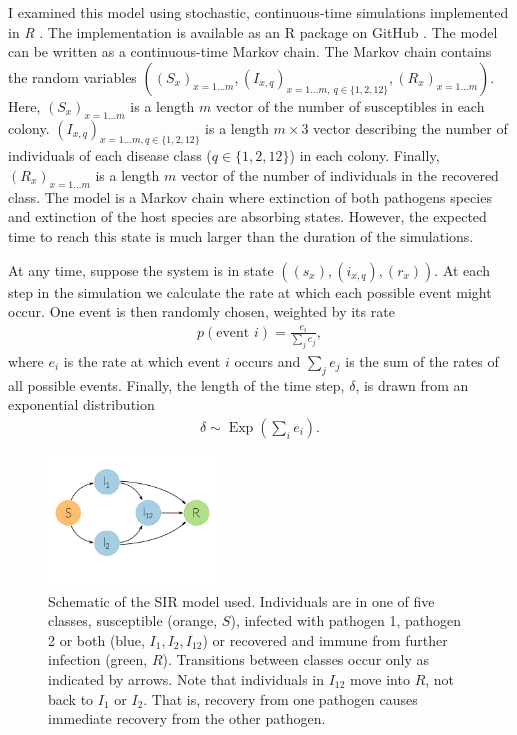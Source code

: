 I examined this model using stochastic, continuous-time simulations implemented in \emph{R} \cite{R}.
The implementation is available as an R package on GitHub \cite{metapopepi}.
The model can be written as a continuous-time Markov chain.
The Markov chain contains the random variables $((S_x)_{x = 1\ldots m}, (I_{x, q})_{x =1\ldots m,\:q \in \{1, 2, 12\}}, (R_x)_{x = 1\ldots m})$.
Here, $(S_x)_{x = 1\ldots m}$ is a length $m$ vector of the number of susceptibles in each colony.
$(I_{x, q})_{x =1\ldots m, q \in \{1, 2, 12\}}$ is a length $m \times 3$ vector describing the number of individuals of each disease class ($q \in \{1, 2, 12\}$) in each colony.
Finally, $(R_x)_{x = 1\ldots m}$ is a length $m$ vector of the number of individuals in the recovered class.
The model is a Markov chain where extinction of both pathogens species and extinction of the host species are absorbing states.
However, the expected time to reach this state is much larger than the duration of the simulations.

At any time, suppose the system is in state $((s_x), (i_{x,q}), (r_x))$.
At each step in the simulation we calculate the rate at which each possible event might occur.
One event is then randomly chosen, weighted by its rate
\begin{align}
  p(\text{event } i) = \frac{e_i}{\sum_j e_j},
\end{align}
where $e_i$ is the rate at which event $i$ occurs and $\sum_j e_j$ is the sum of the rates of all possible events.
Finally, the length of the time step, $\delta$, is drawn from an exponential distribution 
\begin{align}
  \delta \sim \operatorname{Exp}\left(\sum_i e_i  \right).
\end{align}


\begin{figure}[t]
\centering
  \includegraphics[width=0.4\textwidth]{imgs/SIRoption1.pdf}
  \caption[Schematic of the SIR model used]{
  Schematic of the SIR model used. 
  Individuals are in one of five classes, susceptible (orange, $S$), infected with pathogen 1, pathogen 2 or both (blue, $I_1, I_2, I_{12}$) or recovered and immune from further infection (green, $R$).
  Transitions between classes occur only as indicated by arrows.
  Note that individuals in $I_{12}$ move into $R$, not back to $I_1$ or $I_2$. 
  That is, recovery from one pathogen causes immediate recovery from the other pathogen.
  }
\label{f:sir}
\end{figure}


